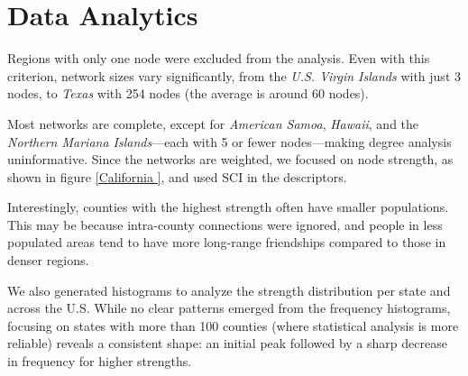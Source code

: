 \newpage

\section{Data Analytics}

Regions with only one node were excluded from the analysis. Even with this criterion, network sizes vary significantly, from the \textsl{U.S. Virgin Islands} with just 3 nodes, to \textsl{Texas} with 254 nodes (the average is around 60 nodes).

Most networks are complete, except for \textsl{American Samoa}, \textsl{Hawaii}, and the \textsl{Northern Mariana Islands}—each with 5 or fewer nodes—making degree analysis uninformative. Since the networks are weighted, we focused on node strength, as shown in figure \ref{California
}, and used SCI in the descriptors.

Interestingly, counties with the highest strength often have smaller populations. This may be because intra-county connections were ignored, and people in less populated areas tend to have more long-range friendships compared to those in denser regions.

We also generated histograms to analyze the strength distribution per state and across the U.S. While no clear patterns emerged from the frequency histograms, focusing on states with more than 100 counties (where statistical analysis is more reliable) reveals a consistent shape: an initial peak followed by a sharp decrease in frequency for higher strengths.




